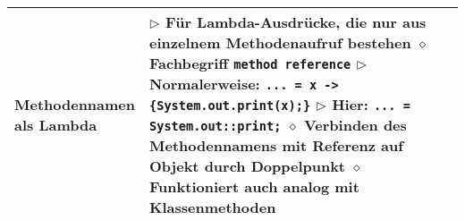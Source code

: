 \begin{longtable}{ | p{} p{} | }
    \makecell[l]{Methodennamen \\ als Lambda} & \makecell[l]{
    $\triangleright$ Für Lambda-Ausdrücke, die nur aus einzelnem Methodenaufruf bestehen \\
    \hspace{0.4cm} $\diamond$ Fachbegriff \texttt{method reference} \\
    $\triangleright$ Normalerweise: \texttt{... = x -> \{System.out.print(x);\}} \\
    $\triangleright$ Hier: \texttt{... = System.out::print;} \\
    \hspace{0.4cm} $\diamond$ Verbinden des Methodennamens mit Referenz auf Objekt durch Doppelpunkt \\
    \hspace{0.4cm} $\diamond$ Funktioniert auch analog mit Klassenmethoden} \\ \hline

    \end{longtable}

